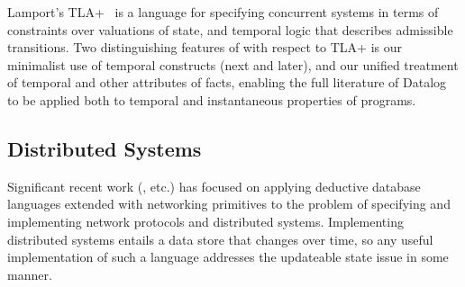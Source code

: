 Lamport's TLA+~\cite{tla} is a language for specifying 
concurrent systems in terms of constraints over valuations of state, and temporal logic that describes admissible transitions.  
Two distinguishing features of \lang with respect to TLA+ is our minimalist use of temporal constructs (next and later), and our unified treatment of temporal and other attributes of facts, enabling the full literature of Datalog to be applied both to temporal and instantaneous properties of programs.

\subsection{Distributed Systems}

Significant recent work (\cite{boom-eurosys,Belaramani:2009,Chu:2007,Loo2009-CACM}, etc.) has focused on applying deductive database languages extended with networking 
primitives to the problem of specifying and implementing network protocols and distributed systems.  Implementing distributed systems entails 
a data store that changes over time, so any useful implementation of such a language addresses the updateable state issue in some manner. 


